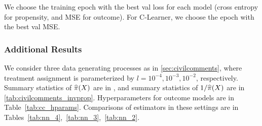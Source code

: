 We choose the training epoch with the best val loss for each model (cross entropy for propensity, and MSE for outcome). For C-Learner, we choose the epoch with the best val MSE. 



\subsubsection{Additional Results}
\label{sec:more_nlp_results}
We consider three data generating processes as in \cref{sec:civilcomments}, where treatment assignment is parameterized by $l=10^{-4},10^{-3},10^{-2}$, respectively. 
Summary statistics of $\widehat{\pi}(X)$ are in , and summary statistics of $1/\widehat{\pi}(X)$ are in \cref{tab:civilcomments_invprop}.
Hyperparameters for outcome models are in Table~\ref{tab:cc_hparams}. 
Comparisons of estimators in these settings are in Tables~\ref{tab:nn_4},~\ref{tab:nn_3},~\ref{tab:nn_2}.

